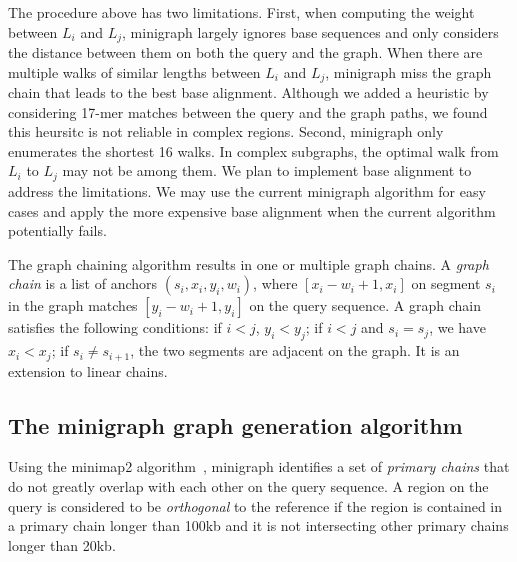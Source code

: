 \documentclass[twocolumn]{bmcart}
\begin{document}
The procedure above has two limitations. First, when computing the weight
between $L_i$ and $L_j$, minigraph largely ignores base sequences and only considers
the distance between them on both the query and the graph. When there are
multiple walks of similar lengths between $L_i$ and $L_j$, minigraph miss the
graph chain that leads to the best base alignment. Although we added a
heuristic by considering 17-mer matches between the query and the graph paths,
we found this heursitc is not reliable in complex regions. Second, minigraph only
enumerates the shortest 16 walks. In complex subgraphs, the optimal walk from
$L_i$ to $L_j$ may not be among them. We plan to implement base
alignment to address the limitations. We may use the current minigraph algorithm
for easy cases and apply the more expensive base alignment when the current
algorithm potentially fails.

The graph chaining algorithm results in one or multiple graph chains.  A
\emph{graph chain} is a list of anchors $(s_i,x_i,y_i,w_i)$, where
$[x_i-w_i+1,x_i]$ on segment $s_i$ in the graph matches $[y_i-w_i+1,y_i]$ on
the query sequence. A graph chain satisfies the following conditions: if $i<j$,
$y_i<y_j$; if $i<j$ and $s_i=s_j$, we have $x_i<x_j$; if $s_i\not=s_{i+1}$, the
two segments are adjacent on the graph. It is an extension to linear chains.

\subsection*{The minigraph graph generation algorithm}

Using the minimap2 algorithm~\cite{Li:2018ab}, minigraph identifies a set of
\emph{primary chains} that do not greatly overlap with each other on the query
sequence. A region on the query is considered to be \emph{orthogonal} to the
reference if the region is contained in a primary chain longer than 100kb and
it is not intersecting other primary chains longer than 20kb.
\end{document}
